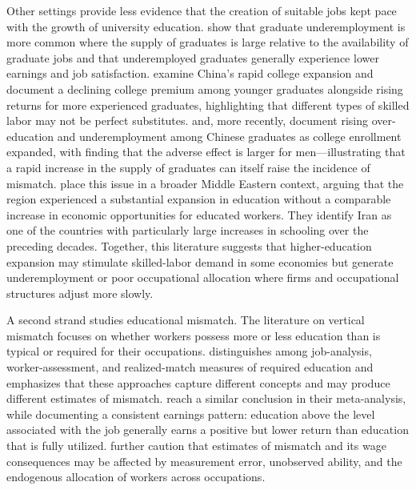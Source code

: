 Other settings provide less evidence that the creation of suitable jobs kept pace with the growth of university education. \citet{green2016} show that graduate underemployment is more common where the supply of graduates is large relative to the availability of graduate jobs and that underemployed graduates generally experience lower earnings and job satisfaction. \citet{li_nd} examine China's rapid college expansion and document a declining college premium among younger graduates alongside rising returns for more experienced graduates, highlighting that different types of skilled labor may not be perfect substitutes. \citet{li2008} and, more recently, \citet{su2025} document rising over-education and underemployment among Chinese graduates as college enrollment expanded, with \citet{su2025} finding that the adverse effect is larger for men---illustrating that a rapid increase in the supply of graduates can itself raise the incidence of mismatch. \citet{campante2012} place this issue in a broader Middle Eastern context, arguing that the region experienced a substantial expansion in education without a comparable increase in economic opportunities for educated workers. They identify Iran as one of the countries with particularly large increases in schooling over the preceding decades. Together, this literature suggests that higher-education expansion may stimulate skilled-labor demand in some economies but generate underemployment or poor occupational allocation where firms and occupational structures adjust more slowly.

A second strand studies educational mismatch. The literature on vertical mismatch focuses on whether workers possess more or less education than is typical or required for their occupations. \citet{hartog2000} distinguishes among job-analysis, worker-assessment, and realized-match measures of required education and emphasizes that these approaches capture different concepts and may produce different estimates of mismatch. \citet{groot2000} reach a similar conclusion in their meta-analysis, while documenting a consistent earnings pattern: education above the level associated with the job generally earns a positive but lower return than education that is fully utilized. \citet{leuven2011} further caution that estimates of mismatch and its wage consequences may be affected by measurement error, unobserved ability, and the endogenous allocation of workers across occupations.

